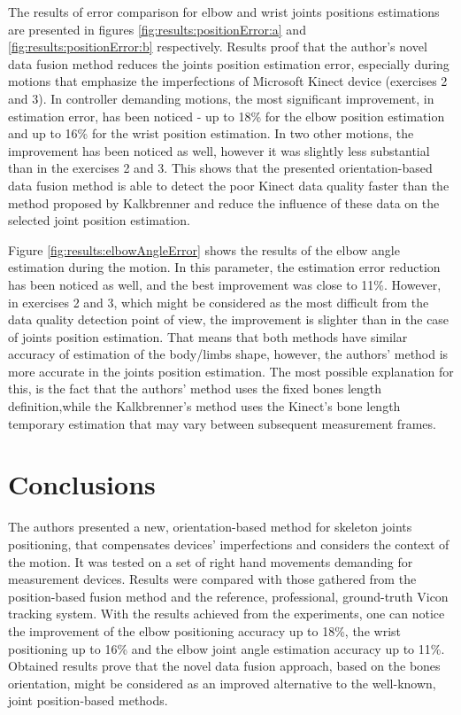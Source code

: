 \documentclass[sensors,article,submit,moreauthors,pdftex,10pt,a4paper]{mdpi}
\begin{document}
	The results of error comparison for elbow and wrist joints positions estimations are presented in figures \ref{fig:results:positionError:a} and \ref{fig:results:positionError:b} respectively. Results proof that the author’s novel data fusion method reduces the joints position estimation error, especially during motions that emphasize the imperfections of Microsoft Kinect device (exercises 2 and 3). In controller demanding motions, the most significant improvement, in estimation error, has been noticed - up to 18\% for the elbow position estimation and up to 16\% for the wrist position estimation. In two other motions, the improvement has been noticed as well, however it was slightly less substantial than in the exercises 2 and 3. This shows that the presented orientation-based data fusion method is able to detect the poor Kinect data quality faster than the method proposed by Kalkbrenner and reduce the influence of these data on the selected joint position estimation. 
	
	Figure \ref{fig:results:elbowAngleError} shows the results of the elbow angle estimation during the motion. In this parameter, the estimation error reduction has been noticed as well, and the best improvement was close to 11\%. However, in exercises 2 and 3, which might be considered as the most difficult from the data quality detection point of view, the improvement is slighter than in the case of joints position estimation. That means that both methods have similar accuracy of estimation of the body/limbs shape, however, the authors’ method is more accurate in the joints position estimation. The most possible explanation for this, is the fact that the authors’ method uses the fixed bones length definition,while the Kalkbrenner’s method uses the Kinect’s bone length temporary estimation that may vary between subsequent measurement frames.
	
	\section{Conclusions}
	
	
	The authors presented a new, orientation-based method for skeleton joints positioning, that compensates devices' imperfections and considers the context of the motion. It was tested on a set of right hand movements demanding for measurement devices. Results were compared with those gathered from the position-based fusion method and the reference, professional, ground-truth Vicon tracking system. With the results achieved from the experiments, one can notice the improvement of the elbow positioning accuracy up to 18\%, the wrist positioning up to 16\% and the elbow joint angle estimation accuracy up to 11\%.
	Obtained results prove that the novel data fusion approach, based on the bones orientation, might be considered as an improved alternative to the well-known, joint position-based methods.
	
\end{document}
